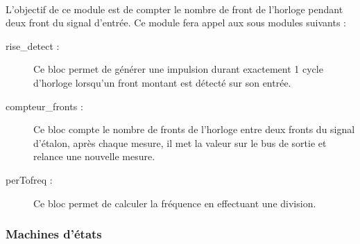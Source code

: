 \documentclass[a4paper,11pt]{article}
\begin{document}
\paragraph{} L'objectif de ce module est de compter le nombre de front de l'horloge pendant deux front du signal d'entrée.
Ce module fera appel aux sous modules suivants :

\begin{description}
  \item[rise\_detect : ] Ce bloc permet de générer une impulsion durant exactement 1 cycle d'horloge lorsqu'un front montant est détecté
  sur son entrée.
  \item[compteur\_fronts : ] Ce bloc compte le nombre de fronts de l'horloge entre deux fronts du signal d'étalon, après chaque mesure,
  il met la valeur sur le bus de sortie et relance une nouvelle mesure.
\item[perTofreq : ] Ce bloc permet de calculer la fréquence en effectuant une division.
\end{description}


  \subsubsection{Machines d'états}
  
\end{document}
